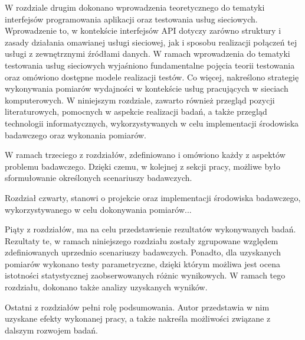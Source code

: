 W rozdziale drugim dokonano wprowadzenia teoretycznego do tematyki interfejsów programowania aplikacji oraz testowania usług sieciowych. Wprowadzenie to, w kontekście interfejsów API dotyczy zarówno struktury i zasady działania omawianej usługi sieciowej, jak i sposobu realizacji połączeń tej usługi z zewnętrznymi źródłami danych. W ramach wprowadzenia do tematyki testowania usług sieciowych wyjaśniono fundamentalne pojęcia teorii testowania oraz omówiono dostępne modele realizacji testów. Co więcej, nakreślono strategię wykonywania pomiarów wydajności w kontekście usług pracujących w sieciach komputerowych. W niniejszym rozdziale, zawarto również przegląd pozycji literaturowych, pomocnych w aspekcie realizacji badań, a także przegląd technologii informatycznych, wykorzystywanych w celu implementacji środowiska badawczego oraz wykonania pomiarów.

W ramach trzeciego z rozdziałów, zdefiniowano i omówiono każdy z aspektów problemu badawczego. Dzięki czemu, w kolejnej z sekcji pracy, możliwe było sformułowanie określonych scenariuszy badawczych.

Rozdział czwarty, stanowi o projekcie oraz implementacji środowiska badawczego, wykorzystywanego w celu dokonywania pomiarów...

Piąty z rozdziałów, ma na celu przedstawienie rezultatów wykonywanych badań. Rezultaty te, w ramach niniejszego rozdziału zostały zgrupowane względem zdefiniowanych uprzednio scenariuszy badawczych. Ponadto, dla uzyskanych pomiarów wykonano testy parametryczne, dzięki którym możliwa jest ocena istotności statystycznej zaobserwowanych różnic wynikowych. W ramach tego rozdziału, dokonano także analizy uzyskanych wyników.

Ostatni z rozdziałów pełni rolę podsumowania. Autor przedstawia w nim uzyskane efekty wykonanej pracy, a także nakreśla możliwości związane z dalszym rozwojem badań.